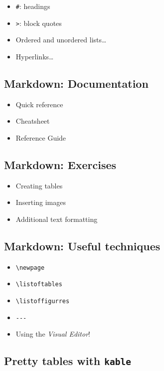 \documentclass[
]{article}
\providecommand{\tightlist}{%
  \setlength{\itemsep}{0pt}\setlength{\parskip}{0pt}}
\begin{document}
\begin{itemize}
\tightlist
\item
  \texttt{\#}: headings
\item
  \texttt{\textgreater{}}: block quotes
\item
  Ordered and unordered lists\ldots{}
\item
  Hyperlinks\ldots{}
\end{itemize}

\subsection{Markdown: Documentation}\label{markdown-documentation}

\begin{itemize}
\tightlist
\item
  Quick reference
\item
  Cheatsheet
\item
  Reference Guide
\end{itemize}

\subsection{Markdown: Exercises}\label{markdown-exercises}

\begin{itemize}
\tightlist
\item
  Creating tables
\item
  Inserting images
\item
  Additional text formatting
\end{itemize}

\subsection{Markdown: Useful
techniques}\label{markdown-useful-techniques}

\begin{itemize}
\tightlist
\item
  \texttt{\textbackslash{}newpage}
\item
  \texttt{\textbackslash{}listoftables}
\item
  \texttt{\textbackslash{}listoffigurres}
\item
  \texttt{-\/-\/-}
\item
  Using the \emph{Visual Editor}!
\end{itemize}

\subsection{\texorpdfstring{Pretty tables with
\texttt{kable}}{Pretty tables with kable}}\label{pretty-tables-with-kable}
\end{document}
